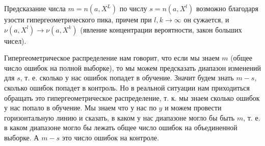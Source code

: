 Предсказание числа $m=n(a, X^L)$ по числу $s=n(a, X^l)$ возможно благодаря узости гипергеометрического пика, причем при $l,k \rightarrow \infty$ он сужается, и $\nu(a, X^l) \rightarrow \nu(a, X^k)$ (явление концентрации вероятности, закон больших чисел).

Гипергеометрическое распределение нам говорит, что если мы знаем $m$ (общее число ошибок на полной выборке), то мы можем предсказать диапазон изменений для $s$, т. е. сколько у нас ошибок попадет в обучение. Значит будем знать $m-s$, сколько ошибок попадет в контроль. Но в реальной ситуации нам приходиться обращать это гипергеометрическое распределение, т. к. мы знаем сколько ошибок у нас попало в обучение. Мы знаем что у нас по $y$ и можем провести горизонтальную линию и сказать, в каком у нас диапазоне могло бы быть $m$, т. е. в каком диапазоне могло бы лежать общее число ошибок на объединенной выборке. А $m-s$ это число ошибок на контроле.

\usetikzlibrary{intersections}

